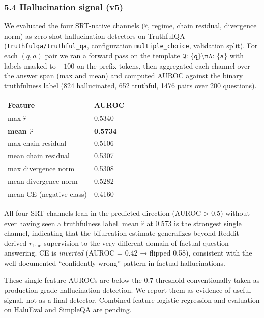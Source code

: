 \documentclass[
  11pt]{article}
\newcounter{none} %
\begin{document}
\subsubsection{5.4 Hallucination signal
(v5)}\label{hallucination-signal-v5}

We evaluated the four SRT-native channels (\(\hat{r}\), regime, chain
residual, divergence norm) as zero-shot hallucination detectors on
TruthfulQA (\texttt{truthfulqa/truthful\_qa}, configuration
\texttt{multiple\_choice}, validation split). For each \((q, a)\) pair
we ran a forward pass on the template
\(\texttt{Q: \{q\}\textbackslash nA: \{a\}}\) with labels masked to
\(-100\) on the prefix tokens, then aggregated each channel over the
answer span (max and mean) and computed AUROC against the binary
truthfulness label (824 hallucinated, 652 truthful, 1476 pairs over 200
questions).

{\def\LTcaptype{none} %
\begin{longtable}[]{@{}ll@{}}
\toprule\noalign{}
Feature & AUROC \\
\midrule\noalign{}
\endhead
\bottomrule\noalign{}
\endlastfoot
max \(\hat{r}\) & 0.5340 \\
\textbf{mean \(\hat{r}\)} & \textbf{0.5734} \\
max chain residual & 0.5106 \\
mean chain residual & 0.5307 \\
max divergence norm & 0.5308 \\
mean divergence norm & 0.5282 \\
mean CE (negative class) & 0.4160 \\
\end{longtable}
}

All four SRT channels lean in the predicted direction (AUROC
\textgreater{} 0.5) without ever having seen a truthfulness label. mean
\(\hat{r}\) at 0.573 is the strongest single channel, indicating that
the bifurcation estimate generalizes beyond Reddit-derived
\(r_{\text{true}}\) supervision to the very different domain of factual
question answering. CE is \emph{inverted} (AUROC = 0.42 → flipped 0.58),
consistent with the well-documented ``confidently wrong'' pattern in
factual hallucinations.

These single-feature AUROCs are below the 0.7 threshold conventionally
taken as production-grade hallucination detection. We report them as
evidence of useful signal, not as a final detector. Combined-feature
logistic regression and evaluation on HaluEval and SimpleQA are pending.
\end{document}
